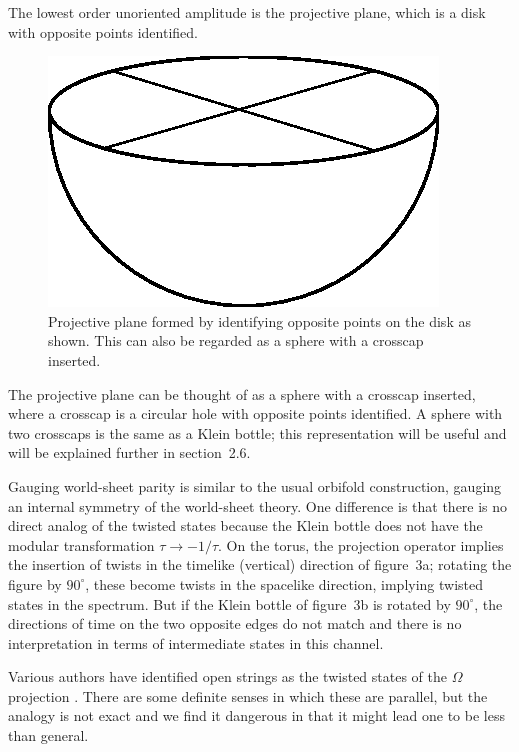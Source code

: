 \documentclass[12pt]{article}
\begin{document}
The lowest order unoriented amplitude is the projective
plane, which is a disk with opposite points identified.
\begin{figure}
\begin{center}
\leavevmode
\includegraphics{proj.eps}
\end{center}
\caption[]{Projective plane formed by identifying opposite points on the
disk as shown.  This can also be regarded as a sphere with a crosscap
inserted.}
\end{figure}
The
projective plane can be thought of as a sphere with a crosscap inserted,
where a crosscap is a
circular hole with opposite points identified.  A sphere with
two crosscaps is the same as a Klein bottle; this representation will be
useful and will be explained further in section~2.6.

Gauging world-sheet parity is similar to the usual orbifold construction,
gauging an internal symmetry of the world-sheet theory.  One difference is
that there is no direct analog of the twisted states because the Klein
bottle does not have the modular transformation $\tau \to -1/\tau$. 
On the torus, the projection operator implies the insertion of twists in the
timelike (vertical) direction of figure~3a; rotating the figure by
$90^\circ$, these become twists in the spacelike direction, implying twisted
states in the spectrum.  But if the Klein bottle of figure~3b is rotated by
$90^\circ$, the directions of time on the two opposite edges do not match and
there is no interpretation in terms of intermediate states in this channel.

Various authors have identified open strings as the twisted states
of the $\Omega$ projection \cite{opentwist,laterc}.  There are some definite
senses in which these are parallel, but the analogy is not exact and we find it
dangerous in that it might lead one to be less than general.
\end{document}
